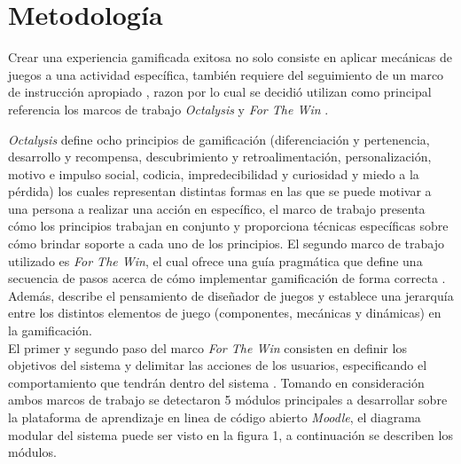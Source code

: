
\section{Metodología}

    Crear una experiencia gamificada exitosa no solo consiste en aplicar mecánicas
    de juegos a una actividad específica, también requiere del seguimiento de un
    marco de instrucción apropiado \cite[p. 1110]{GamInE-Learning}, razon por lo
    cual se decidió utilizan como principal referencia los marcos de trabajo
    {\it Octalysis} \cite{Octalysis} y {\it For The Win} \cite{ForTheWin}.\par
%
    \noindent 
    {\it Octalysis} define ocho principios de gamificación (diferenciación y
    pertenencia, desarrollo y recompensa, descubrimiento y retroalimentación,
    personalización, motivo e impulso social, codicia, impredecibilidad y curiosidad
    y miedo a la pérdida) los cuales representan distintas formas en las que se
    puede motivar a una persona a realizar una acción en específico, el marco de
    trabajo presenta cómo los principios trabajan en conjunto y proporciona técnicas
    específicas sobre cómo brindar soporte a cada uno de los principios.
%
    El segundo marco de trabajo utilizado es {\it For The Win}, el cual ofrece una
    guía pragmática que define una secuencia de pasos acerca de cómo implementar
    gamificación de forma correcta \cite{ForTheWin}. Además, describe el pensamiento
    de diseñador de juegos y establece una jerarquía entre los distintos elementos
    de juego (componentes, mecánicas y dinámicas) en la gamificación.\\
%
    El primer y segundo paso del marco {\it For The Win} consisten en definir
    los objetivos del sistema y delimitar las acciones de los usuarios, especificando
    el comportamiento que tendrán dentro del sistema \cite[p. 61, 63]{ForTheWin}.
    Tomando en consideración ambos marcos de trabajo se detectaron 5 módulos
    principales a desarrollar sobre la plataforma de aprendizaje en linea de código
    abierto {\it Moodle}, el diagrama modular del sistema puede ser visto en la
    figura 1, a continuación se describen los módulos.\par
%
